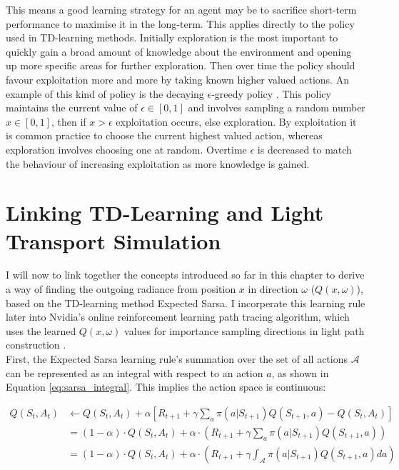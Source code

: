 \documentclass[../dissertation.tex]{subfiles}
\begin{document}
This means a good learning strategy for an agent may be to sacrifice short-term performance to maximise it in the long-term. This applies directly to the policy used in TD-learning methods. Initially exploration is the most important to quickly gain a broad amount of knowledge about the environment and opening up more specific areas for further exploration. Then over time the policy should favour exploitation more and more by taking known higher valued actions. An example of this kind of policy is the decaying $\epsilon$-greedy policy \cite{sutton2011reinforcement}. This policy maintains the current value of $\epsilon \in [0,1]$ and involves sampling a random number $x \in [0,1]$, then if $x > \epsilon$ exploitation occurs, else exploration. By exploitation it is common practice to choose the current highest valued action, whereas exploration involves choosing one at random. Overtime $\epsilon$ is decreased to match the behaviour of increasing exploitation as more knowledge is gained.

\section{Linking TD-Learning and Light Transport Simulation}
\label{sec:td_light_transport}
I will now to link together the concepts introduced so far in this chapter to derive a way of finding the outgoing radiance from position $x$ in direction $\omega$ ($Q(x, \omega)$), based on the TD-learning method Expected Sarsa. I incorperate this learning rule later into Nvidia's online reinforcement learning path tracing algorithm, which uses the learned $Q(x, \omega)$ values for importance sampling directions in light path construction \cite{dahm2017learning}.\\

First, the Expected Sarsa learning rule's summation over the set of all actions $\mathcal{A}$ can be represented as an integral with respect to an action $a$, as shown in Equation \ref{eq:sarsa_integral}. This implies the action space is continuous:

\begin{align}
Q(S_t, A_t) & \leftarrow Q(S_t, A_t) + \alpha [R_{t+1} + \gamma \sum_a \pi(a| S_{t+1}) Q(S_{t+1}, a) - Q(S_t, A_t)]\\
& =  (1 - \alpha) \cdot Q(S_{t},A_t) + \alpha \cdot \left( R_{t+1} + \gamma \sum_a \pi(a|S_{t+1}) Q(S_{t+1}, a) \right)\\
& = (1 - \alpha) \cdot Q(S_{t},A_t) + \alpha \cdot \left( R_{t+1} + \gamma \int_\mathcal{A} \pi(a|S_{t+1}) Q(S_{t+1}, a) da \right)
 \label{eq:sarsa_integral}
\end{align}
\end{document}
